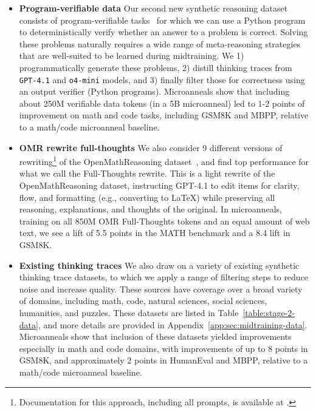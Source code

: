 \documentclass[table]{ai2style/ai2}
\begin{document}
\begin{itemize}
\item {\bf{Program-verifiable data}}
Our second new synthetic reasoning dataset consists of program-verifiable tasks~\citep{zeng2025rlve} for which we can use a Python program to deterministically verify whether an answer to a problem is correct. Solving these problems naturally requires a wide range of meta-reasoning strategies that are well-suited to be learned during midtraining. We 1) programmatically generate these problems, 2) distill thinking traces from  \texttt{GPT-4.1} and \texttt{o4-mini} models, and 3) finally filter those for correctness using an output verifier (Python programs). 
Microanneals show that including about 250M verifiable data tokens (in a 5B microanneal) led to 1-2 points of improvement on math and code tasks, including GSM8K and MBPP, relative to a math/code microanneal baseline.

\item{\bf{OMR rewrite full-thoughts}} We also consider 9 different versions of rewriting\footnote{Documentation for this approach, including all prompts, is available at \href{https://github.com/allenai/dolma3/tree/main/datasets/dolma3_dolmino_mix/open_math_reasoning_rewrites}{}.} of the OpenMathReasoning dataset~\citep{moshkov2025aimo2}, and find top performance for what we call the Full-Thoughts rewrite. This is a light rewrite of the OpenMathReasoning dataset, instructing GPT-4.1 to edit items for clarity, flow, and formatting (e.g., converting to LaTeX) while preserving all reasoning, explanations, and thoughts of the original. In microanneals, training on all 850M OMR Full-Thoughts tokens and an equal amount of web text, we see a lift of 5.5 points in the MATH benchmark and a 8.4 lift in GSM8K.

\item {\bf Existing thinking traces}
We also draw on a variety of existing synthetic thinking trace datasets, to which we apply a range of filtering steps to reduce noise and increase quality. These sources have coverage over a broad variety of domains, including math, code, natural sciences, social sciences, humanities, and puzzles. These datasets are listed in Table~\ref{table:stage-2-data}, and more details are provided in Appendix~\ref{app:sec:midtraining-data}. 
Microanneals show that inclusion of these datasets yielded improvements especially in math and code domains, with improvements of up to 8 points in GSM8K, and approximately 2 points in HumanEval and MBPP, relative to a math/code microanneal baseline.
\end{itemize}
\end{document}
